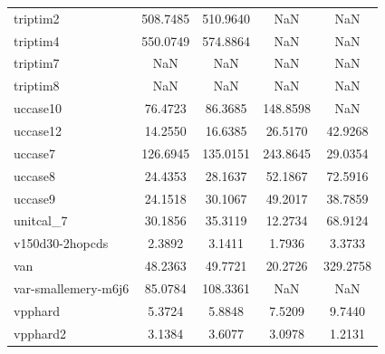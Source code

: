 \begin{longtable}{lcccc}
triptim2                    &  508.7485 & 510.9640 &       NaN &       NaN \\
triptim4                    &  550.0749 & 574.8864 &       NaN &       NaN \\
triptim7                    &       NaN &      NaN &       NaN &       NaN \\
triptim8                    &       NaN &      NaN &       NaN &       NaN \\
uccase10                    &   76.4723 &  86.3685 &  148.8598 &       NaN \\
uccase12                    &   14.2550 &  16.6385 &   26.5170 &   42.9268 \\
uccase7                     &  126.6945 & 135.0151 &  243.8645 &   29.0354 \\
uccase8                     &   24.4353 &  28.1637 &   52.1867 &   72.5916 \\
uccase9                     &   24.1518 &  30.1067 &   49.2017 &   38.7859 \\
unitcal\_7                   &   30.1856 &  35.3119 &   12.2734 &   68.9124 \\
v150d30-2hopcds             &    2.3892 &   3.1411 &    1.7936 &    3.3733 \\
van                         &   48.2363 &  49.7721 &   20.2726 &  329.2758 \\
var-smallemery-m6j6         &   85.0784 & 108.3361 &       NaN &       NaN \\
vpphard                     &    5.3724 &   5.8848 &    7.5209 &    9.7440 \\
vpphard2                    &    3.1384 &   3.6077 &    3.0978 &    1.2131 \\
\end{longtable}
